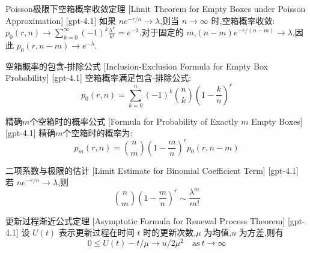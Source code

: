 \documentclass[UTF8]{ctexart}
\begin{document}
    
    
    \begin{thm}
        {Poisson极限下空箱概率收敛定理}
        [Limit Theorem for Empty Boxes under Poisson Approximation]
        [gpt-4.1]
        如果 $n e^{- r / n} \to \lambda$,则当 $n \to \infty$ 时,空箱概率收敛:$p_0(r,n) \to \sum_{k=0}^\infty (-1)^k \frac{\lambda^k}{k!} = e^{-\lambda}$.对于固定的 $m$,$(n - m) e^{- r / (n-m)} \to \lambda$,因此 $p_0(r, n-m) \to e^{-\lambda}$.
    \end{thm}
    
    
    
    \begin{ppt}
        {空箱概率的包含-排除公式}
        [Inclusion-Exclusion Formula for Empty Box Probability]
        [gpt-4.1]
        空箱概率满足包含-排除公式:
\[
p_0(r, n) = \sum_{k=0}^n (-1)^k \binom{n}{k} \left(1 - \frac{k}{n}\right)^r
\]

    \end{ppt}
    
    
    
    \begin{ppt}
        {精确$m$个空箱时的概率公式}
        [Formula for Probability of Exactly $m$ Empty Boxes]
        [gpt-4.1]
        精确$m$个空箱时的概率为:
\[
p_m(r, n) = \binom{n}{m} \left(1 - \frac{m}{n}\right)^r p_0(r, n-m)
\]

    \end{ppt}
    
    
    
    \begin{lma}
        {二项系数与极限的估计}
        [Limit Estimate for Binomial Coefficient Term]
        [gpt-4.1]
        若 $n e^{- r / n} \to \lambda$,则
\[
\binom{n}{m} \left(1 - \frac{m}{n}\right)^{r} \sim \frac{\lambda^m}{m!}
\]

    \end{lma}
    
    
    
    \begin{thm}
        {更新过程渐近公式定理}
        [Asymptotic Formula for Renewal Process Theorem]
        [gpt-4.1]
        设 $U(t)$ 表示更新过程在时间 $t$ 时的更新次数,$\mu$ 为均值,$
u$ 为方差,则有
\[
0 \leq U(t) - t/\mu \to 
u/2\mu^2 \quad \mathrm{as}\ t\to \infty
\]

    \end{thm}
    
\end{document}
